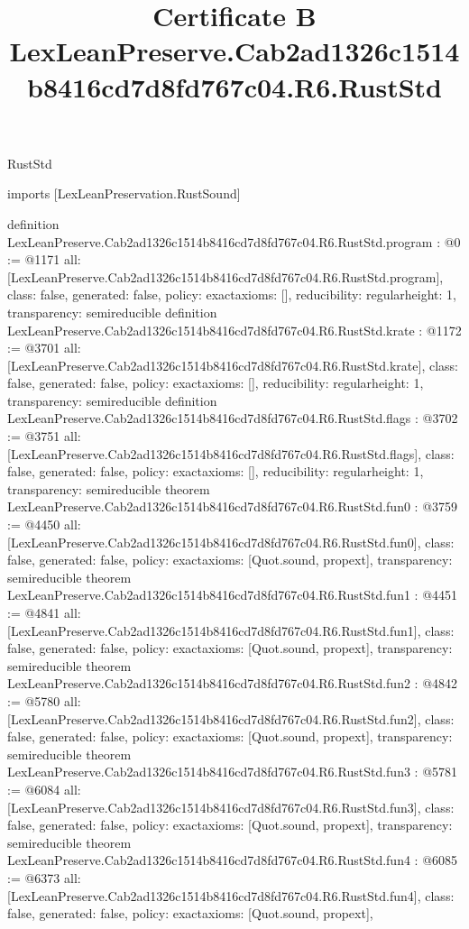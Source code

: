 \begin{lexlean}{RustStd}
\title{Certificate B LexLeanPreserve.Cab2ad1326c1514b8416cd7d8fd767c04.R6.RustStd}
\begin{coremodule}
imports [LexLeanPreservation.RustSound]

definition LexLeanPreserve.Cab2ad1326c1514b8416cd7d8fd767c04.R6.RustStd.program : @0 := @1171 {
  all: [LexLeanPreserve.Cab2ad1326c1514b8416cd7d8fd767c04.R6.RustStd.program],
  class: false,
  generated: false,
  policy: exact{axioms: []},
  reducibility: regular{height: 1},
  transparency: semireducible
}
definition LexLeanPreserve.Cab2ad1326c1514b8416cd7d8fd767c04.R6.RustStd.krate : @1172 := @3701 {
  all: [LexLeanPreserve.Cab2ad1326c1514b8416cd7d8fd767c04.R6.RustStd.krate],
  class: false,
  generated: false,
  policy: exact{axioms: []},
  reducibility: regular{height: 1},
  transparency: semireducible
}
definition LexLeanPreserve.Cab2ad1326c1514b8416cd7d8fd767c04.R6.RustStd.flags : @3702 := @3751 {
  all: [LexLeanPreserve.Cab2ad1326c1514b8416cd7d8fd767c04.R6.RustStd.flags],
  class: false,
  generated: false,
  policy: exact{axioms: []},
  reducibility: regular{height: 1},
  transparency: semireducible
}
theorem LexLeanPreserve.Cab2ad1326c1514b8416cd7d8fd767c04.R6.RustStd.fun0 : @3759 := @4450 {
  all: [LexLeanPreserve.Cab2ad1326c1514b8416cd7d8fd767c04.R6.RustStd.fun0],
  class: false,
  generated: false,
  policy: exact{axioms: [Quot.sound, propext]},
  transparency: semireducible
}
theorem LexLeanPreserve.Cab2ad1326c1514b8416cd7d8fd767c04.R6.RustStd.fun1 : @4451 := @4841 {
  all: [LexLeanPreserve.Cab2ad1326c1514b8416cd7d8fd767c04.R6.RustStd.fun1],
  class: false,
  generated: false,
  policy: exact{axioms: [Quot.sound, propext]},
  transparency: semireducible
}
theorem LexLeanPreserve.Cab2ad1326c1514b8416cd7d8fd767c04.R6.RustStd.fun2 : @4842 := @5780 {
  all: [LexLeanPreserve.Cab2ad1326c1514b8416cd7d8fd767c04.R6.RustStd.fun2],
  class: false,
  generated: false,
  policy: exact{axioms: [Quot.sound, propext]},
  transparency: semireducible
}
theorem LexLeanPreserve.Cab2ad1326c1514b8416cd7d8fd767c04.R6.RustStd.fun3 : @5781 := @6084 {
  all: [LexLeanPreserve.Cab2ad1326c1514b8416cd7d8fd767c04.R6.RustStd.fun3],
  class: false,
  generated: false,
  policy: exact{axioms: [Quot.sound, propext]},
  transparency: semireducible
}
theorem LexLeanPreserve.Cab2ad1326c1514b8416cd7d8fd767c04.R6.RustStd.fun4 : @6085 := @6373 {
  all: [LexLeanPreserve.Cab2ad1326c1514b8416cd7d8fd767c04.R6.RustStd.fun4],
  class: false,
  generated: false,
  policy: exact{axioms: [Quot.sound, propext]},
}
\end{coremodule}
\end{lexlean}
